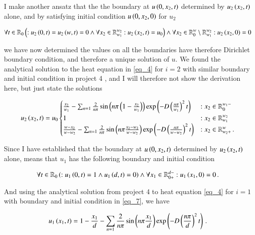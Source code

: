 \documentclass[11pt,english,a4paper]{article}
\begin{document}
\begin{flushleft}
I make another ansatz that the the boundary at $u\left({0,x_2,t}\right)$ determined by $u_2\left({x_2,t}\right)$ alone, and by satisfying initial condition $u\left({0,x_2,0}\right)$ for $u_2$

\begin{align}
\forall t \in \mathbb{R}_0 \left({: u_2\left({0,t}\right) = u_2\left({w,t}\right) = 0 \wedge \forall x_2\in\mathbb{R}_{w_1}^{w_2}: u_2\left({x_2,t}\right) = u_0}\right) \wedge \forall x_2 \in\mathbb{R}_{0}^{w} \setminus \mathbb{R}_{w_1}^{w_2}: u_2\left({x_2,0}\right) = 0
\label{eq_5}
\end{align}

we have now determined the values on all the boundaries have therefore Dirichlet boundary condition, and therefore a unique solution of $u$. We found the analytical solution to the heat equation in \eqref{eq_4} for $i=2$ with similar boundary and initial condition in project 4 \cite{project4}, and I will therefore not show the derivation here, but just state the solutions

\begin{align}
u_2\left({x_2,t}\right) = u_0 \begin{cases} \frac{x_2}{w_1} - \sum_{n=1} \frac{2}{n \pi} \sin\left({n\pi\left({1-\frac{x_2}{w_1}}\right)}\right)\exp\left({-D\left({\frac{n\pi}{w_1}}\right)^2 t}\right) &: x_2\in\mathbb{R}_0^{w_1-}\\ 1 &: x_2 \in\mathbb{R}_{w_1}^{w_2} \\  \frac{w-x_2}{w-w_2} - \sum_{n=1} \frac{2}{n \pi} \sin\left({n\pi\frac{x_2-w_2}{w-w_2}}\right)\exp\left({-D\left({\frac{n\pi}{w-w_2}}\right)^2 t}\right) & : x_2\in\mathbb{R}_{w_2+}^w \,.\end{cases}
\label{eq_6}
\end{align}

Since I have established that the boundary at $u\left({0,x_2,t}\right)$ determined by $u_2\left({x_2,t}\right)$ alone, means that $u_1$ has the following boundary and initial condition

\begin{align}
\forall t \in \mathbb{R}_0\left({: u_1\left({0,t}\right) = 1 \wedge u_1\left({d,t}\right) = 0}\right) \wedge  \forall x_1 \in \mathbb{R}_{0+}^{d-} : u_1\left({x_1,0}\right)=0 \,.  
\label{eq_7}
\end{align}

And using the analytical solution from project 4 to heat equation \eqref{eq_4} for $i=1$ with boundary and initial condition in \eqref{eq_7}, we have 

\begin{align}
u_1\left({x_1,t}\right) = 1-\frac{x_1}{d} - \sum_{n=1} \frac{2}{n \pi} \sin\left({n\pi\frac{x_1}{d}}\right)\exp\left({-D\left({\frac{n\pi}{d}}\right)^2 t}\right) \,.
\label{eq_8}
\end{align}


\end{flushleft}
\end{document}

